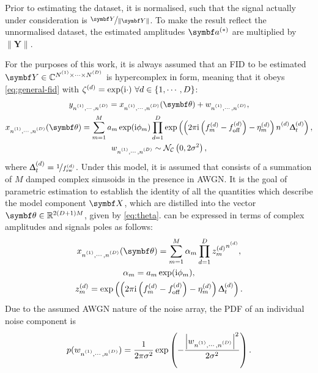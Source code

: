 \begin{remark}
    \label{rem:norm-data}
    Prior to estimating the dataset, it is normalised, such that the signal
    actually under consideration is $\nicefrac{\bY}{\lVert \bY \rVert}$.
    To make the result reflect the unnormalised dataset, the estimated
    amplitudes $\bdastar$ are multiplied by $\lVert \symbf{Y} \rVert$.
\end{remark}
For the purposes of this work, it is always assumed that an \ac{FID} to be
estimated
$\bY \in \mathbb{C}^{\None \times \cdots \times \ND}$
is hypercomplex in form, meaning that it obeys
\cref{eq:general-fid} with $\zeta^{(d)} = \exp(\mathrm{i} \cdot)\ \forall d \in
\lbrace 1, \cdots, D \rbrace$:
\begin{subequations}
    \begin{gather}
        \ynonenD = \xnonenD(\bth) + \wnonenD,\\
        \xnonenD(\bth) =
        \sumM \amexpphim
        \prodD \exp\left(\left(
            2 \pi \iu \left(f^{(d)}_m - \foffd\right)
            -\eta_m^{(d)}\right)
            \nd \Dtd\right),\label{eq:x}\\
        \wnonenD \sim \mathcal{N_C}\left(0, 2\sigma^2\right),%
    \end{gather}%
    \label{eq:hypercomplex-fid}%
\end{subequations}%
where $\Updelta_t^{(d)} = \nicefrac{1}{f_{\mathrm{sw}}^{(d)}}$.
Under this model, it is assumed that
 consists of a summation of $M$ damped complex sinusoids in the
presence in \ac{AWGN}.
It is the goal of parametric estimation to establish the
identity of all the quantities which describe the model component $\bX$, which
are distilled into the vector $\bth \in \mathbb{R}^{2(D + 1)M}$, given by
\cref{eq:theta}.
 can be expressed in terms of complex amplitudes and signals poles
as follows:
\begin{subequations}%
    \begin{gather}%
        \xnonenD(\bth) = \sumM \alpha_m \prodD {z^{(d)}_m}^{\nd},\\
        \alpha_m = \amexpphim,\\
        z_m^{(d)} = \exp\left(
            \left(2 \pi \iu \left(f_m^{(d)} - \foffd\right) - \eta^{(d)}_m\right) \Dtd
        \right).%
    \end{gather}%
    \label{eq:x-alpha-z}%
\end{subequations}%
Due to the assumed \ac{AWGN} nature of the noise array, the \acf{PDF} of an
individual noise component is
\begin{equation}
    p(\wnonenD) =
        \frac{1}{2\pi \sigma^2}
        \exp\left( -\frac{\left\lvert \wnonenD \right\rvert^2}{2\sigma^2}\right).
\end{equation}
